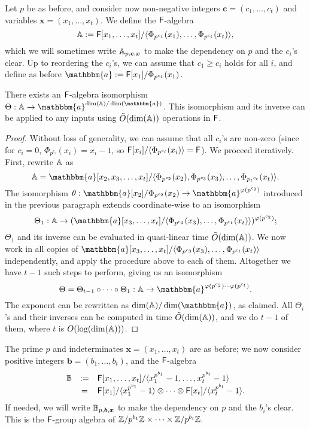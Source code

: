 \smallskip{}
Let $p$ be as before, and consider now non-negative integers
$\boldsymbol{c}=(c_1,\dots,c_t)$ and variables $\boldsymbol{x}=(x_1,\dots,x_t)$. We
define the ${\mathsf{F}}$-algebra
$$\mathbb{A}:={\mathsf{F}}[x_1,\dots,x_t]/\langle \Phi_{p^{c_1}}(x_1), \dots,
\Phi_{p^{c_t}}(x_t)\rangle,$$ which we will sometimes write
$\mathbb{A}_{p,\boldsymbol{c},\boldsymbol{x}}$ to make the dependency on $p$
and the $c_i$'s clear. Up to reordering the $c_i$'s, we can assume
that $c_1 \ge c_i$ holds for all $i$, and define as before
$\mathbbm{a}:=\F[x_1]/\Phi_{p^{c_1}}(x_1)$.

\begin{lemma}\label{lemma:A}
  There exists an ${\mathsf{F}}$-algebra isomorphism $\Theta: \A \to
  \mathbbm{a}^{\dim(\A)/\dim(\mathbbm{a})}$. This isomorphism and its
  inverse can be applied to any inputs using $\tilde{O}(\dim(\mathbb{A}))$
  operations in ${\mathsf{F}}$.
\end{lemma}
\begin{proof}
Without loss of generality, we can assume that all $c_i$'s are non-zero
(since for $c_i=0$, $\Phi_{p^{c_i}}(x_i)=x_i-1$,
so ${\mathsf{F}}[x_i]/\langle \Phi_{p^{c_i}}(x_i) \rangle = {\mathsf{F}}$).
We proceed iteratively. First, rewrite $\mathbb{A}$ as
$$\A=\mathbbm{a}[x_2,x_3,\dots,x_t]/\langle \Phi_{p^{c_2}}(x_2), \Phi_{p^{c_3}}(x_3), \dots,
\Phi_{{p_t}^{c_t}}(x_t)\rangle.$$ 
The isomorphism 
$\theta: \mathbbm{a}[x_2]/\Phi_{p^{c_2}}(x_2) \to \mathbbm{a}^{\varphi(p^{c_2})}$
introduced in the previous paragraph extends coordinate-wise
to an isomorphism 
$$\Theta_1: \A \to (\mathbbm{a}[x_3,\dots,x_t]/\langle
\Phi_{p^{c_3}}(x_3), \dots,
\Phi_{p^{c_t}}(x_t)\rangle)^{\varphi(p^{c_2})};$$ $\Theta_1$ and its
inverse can be evaluated in quasi-linear time $\tilde{O}(\dim(\mathbb{A}))$.
We now work in all copies of $\mathbbm{a}[x_3,\dots,x_t]/\langle
\Phi_{p^{c_3}}(x_3), \dots, \Phi_{p^{c_t}}(x_t)\rangle$ independently,
and apply the procedure above to each of them. Altogether we have
$t-1$ such steps to perform, giving us an isomorphism
$$\Theta = \Theta_{t-1} \circ \cdots \circ \Theta_1:
\A \to
\mathbbm{a}^{\varphi(p^{c_2}) \cdots \varphi(p^{c_t})}.$$
The exponent can be rewritten as $ \dim(\A)/\dim(\mathbbm{a})$, as claimed.
All $\Theta_i$'s and their inverses can be computed
in time $\tilde{O}(\dim(\mathbb{A}))$, and we do $t-1$ of them,
where $t$ is $O(\log(\dim(\mathbb{A})))$. 
\end{proof}

  The prime $p$
and indeterminates $\boldsymbol{x}=(x_1,\dots,x_t)$ are as before; we now consider
positive integers $\boldsymbol{b}=(b_1,\dots,b_t)$, and the ${\mathsf{F}}$-algebra
\[
\begin{array}{ccl}
\B&:=&\F[x_1,\dots,x_t]/\langle x_1^{p^{b_1}}-1,\dots,x_t^{p^{b_t}}-1\rangle\\$$
&=& \F[x_1]/\langle x_1^{p^{b_1}}-1 \rangle \otimes \cdots \otimes \F[x_t]/\langle x_t^{p^{b_t}}-1 \rangle.
\end{array}
\]
If needed, we will write $\mathbb{B}_{p,\boldsymbol{b},\boldsymbol{x}}$ to make the dependency
on $p$ and the $b_i$'s clear. This is the ${\mathsf{F}}$-group algebra
of $\mathbb{Z}/p^{b_1}\mathbb{Z} \times \cdots \times \mathbb{Z}/p^{b_t}\mathbb{Z}$.

